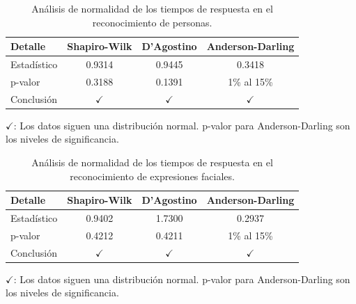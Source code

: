 				\begin{table}[h]
					\centering
					\caption{Análisis de normalidad de los tiempos de respuesta en el reconocimiento de personas.}
					\label{table:PersonsNormality}
					\begin{tabularx}{0.6\textwidth}{Xccc}
						\toprule
						\textbf{Detalle} & \textbf{Shapiro-Wilk} & \textbf{D'Agostino} & \textbf{Anderson-Darling}\\
						\midrule
						Estadístico & 0.9314 & 0.9445 &  0.3418 \\
						p-valor & 0.3188 & 0.1391 & 1\% al 15\% \\
						Conclusión & \(\checkmark\) & \(\checkmark\) & \(\checkmark\)\\
					\end{tabularx}
					\vspace{0.3em} %
					\parbox{0.75\textwidth}{\footnotesize
						\(\checkmark\): Los datos siguen una distribución normal. p-valor para Anderson-Darling son los niveles de significancia.
					}
				\end{table}
				
				\begin{table}[h]
					\centering
					\caption{Análisis de normalidad de los tiempos de respuesta en el reconocimiento de expresiones faciales.}
					\label{FaceExpressionsNormality}
					\begin{tabularx}{0.6\textwidth}{Xccc}
						\toprule
						\textbf{Detalle} & \textbf{Shapiro-Wilk} & \textbf{D'Agostino} & \textbf{Anderson-Darling}\\
						\midrule
						Estadístico & 0.9402 & 1.7300 &  0.2937 \\
						p-valor & 0.4212 & 0.4211 & 1\% al 15\% \\
						Conclusión & \(\checkmark\) & \(\checkmark\) & \(\checkmark\)\\
					\end{tabularx}
					\vspace{0.3em} %
					\parbox{0.75\textwidth}{\footnotesize
						\(\checkmark\): Los datos siguen una distribución normal. p-valor para Anderson-Darling son los niveles de significancia.
					}
				\end{table}
				
